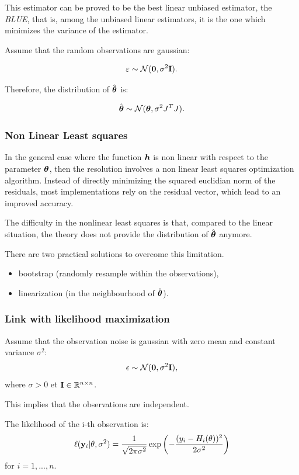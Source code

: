 \documentclass{beamer}
\begin{document}

\begin{frame}
This estimator can be proved to be the best linear unbiased estimator,
the \emph{BLUE}, that is, among the unbiased linear estimators, it is the one
which minimizes the variance of the estimator.

Assume that the random observations are gaussian:

$$
       \varepsilon \sim \mathcal{N}(\boldsymbol{0},\sigma^2 {\bf I}).
$$

Therefore, the distribution of $\hat{\boldsymbol{\theta}}$ is:

$$
       \hat{\boldsymbol{\theta}} \sim \mathcal{N}(\boldsymbol{\theta},\sigma^2 J^T J).
$$


\end{frame}


\begin{frame}
\frametitle{Non Linear Least squares}

In the general case where the function $\boldsymbol{h}$ is non linear
with respect to the parameter $\boldsymbol{\theta}$, then the resolution
involves a non linear least squares optimization algorithm. Instead of
directly minimizing the squared euclidian norm of the residuals, most
implementations rely on the residual vector, which lead to an improved
accuracy.

The difficulty in the nonlinear least squares is that, compared to the
linear situation, the theory does not provide the distribution of
$\hat{\boldsymbol{\theta}}$ anymore.

There are two practical solutions to overcome this limitation.
\begin{itemize}
\item bootstrap (randomly resample within the observations),
\item linearization (in the neighbourhood of $\hat{\boldsymbol{\theta}}$).
\end{itemize}

\end{frame}


\begin{frame}
\frametitle{Link with likelihood maximization}
Assume that the observation noise is gaussian with zero mean and constant 
variance $\sigma^2$: 
$$
\epsilon\sim \mathcal{N}({\bf 0},\sigma^2 {\bf I}),
$$ 
where $\sigma>0$ et ${\bf I}\in\mathbb{R}^{n\times n}$. 

This implies that the observations are independent. 

The likelihood of the i-th observation is:
$$
\ell({\bf y}_i|{\bf \theta},\sigma^2) = 
\frac{1}{\sqrt{2\pi \sigma^2}} 
\exp\left(-\frac{(y_i-H_i({\bf \theta}))^2}{2 \sigma^2}\right)
$$
for $i=1,...,n$. 
\end{frame}
\end{document}
